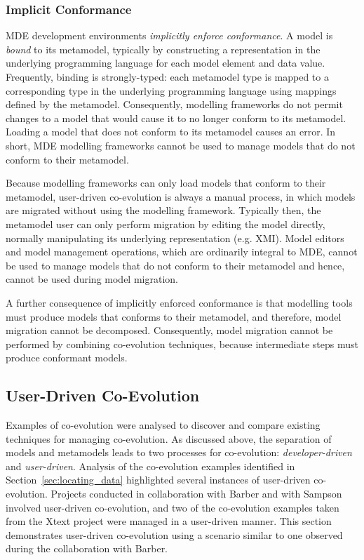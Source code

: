 \subsubsection{Implicit Conformance}
MDE development environments \emph{implicitly enforce conformance}. A model is \emph{bound} to its metamodel, typically by constructing a representation in the underlying programming language for each model element and data value. Frequently, binding is strongly-typed: each metamodel type is mapped to a corresponding type in the underlying programming language using mappings defined by the metamodel. Consequently, modelling frameworks do not permit changes to a model that would cause it to no longer conform to its metamodel. Loading a model that does not conform to its metamodel causes an error. In short, MDE modelling frameworks cannot be used to manage models that do not conform to their metamodel.

Because modelling frameworks can only load models that conform to their metamodel, user-driven co-evolution is always a manual process, in which models are migrated without using the modelling framework. Typically then, the metamodel user can only perform migration by editing the model directly, normally manipulating its underlying representation (e.g. XMI). Model editors and model management operations, which are ordinarily integral to MDE, cannot be used to manage models that do not conform to their metamodel and hence, cannot be used during model migration.

A further consequence of implicitly enforced conformance is that modelling tools must produce models that conforms to their metamodel, and therefore, model migration cannot be decomposed. Consequently, model migration cannot be performed by combining co-evolution techniques, because intermediate steps must produce conformant models.


\subsection{User-Driven Co-Evolution}
\label{subsec:user-driven_co-evolution}
Examples of co-evolution were analysed to discover and compare existing techniques for managing co-evolution. As discussed above, the separation of models and metamodels leads to two processes for co-evolution: \emph{developer-driven} and \emph{user-driven}. Analysis of the co-evolution examples identified in Section~\ref{sec:locating_data} highlighted several instances of user-driven co-evolution. Projects conducted in collaboration with Barber and with Sampson involved user-driven co-evolution, and two of the co-evolution examples taken from the Xtext project were managed in a user-driven manner. This section demonstrates user-driven co-evolution using a scenario similar to one observed during the collaboration with Barber.


